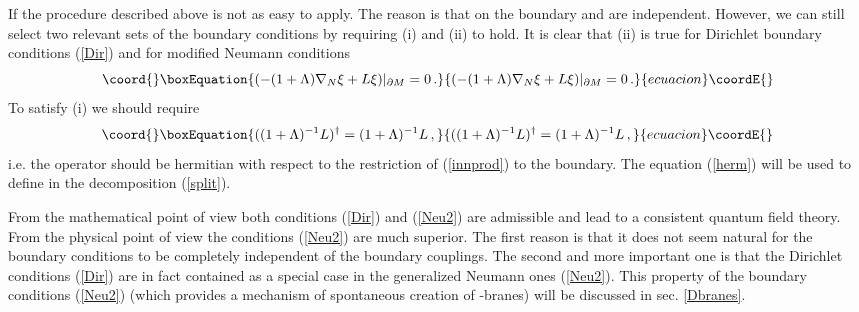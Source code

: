 \documentclass[a4paper,12pt]{article}
\begin{document}
If \coordHE{} the procedure described above is not as 
easy to apply. The reason is that on the boundary
\myHighlight{$\delta\xi$}\coordHE{} and \coordHE{} are independent.
However, we can still select 
two relevant sets of the boundary conditions by requiring 
(i) and (ii) to hold.
It is clear that (ii) is true for Dirichlet boundary
conditions (\ref{Dir}) and for modified Neumann
conditions
\begin{equation}\coord{}\boxEquation{
(-(1+\Lambda )\nabla_N\xi +L\xi )\vert_{\partial M} =0 \,.\label{Neu2}
}{
(-(1+\Lambda )\nabla_N\xi +L\xi )\vert_{\partial M} =0 \,.}{ecuacion}\coordE{}\end{equation}
To satisfy (i) we should require
\begin{equation}\coord{}\boxEquation{
((1+\Lambda )^{-1}L)^\dag =(1+\Lambda )^{-1}L\,, \label{herm}
}{
((1+\Lambda )^{-1}L)^\dag =(1+\Lambda )^{-1}L\,, }{ecuacion}\coordE{}\end{equation}
i.e. the operator \coordHE{} should be hermitian
with respect to the restriction of (\ref{innprod})
to the boundary. The equation (\ref{herm}) will be used
to define \coordHE{} in the decomposition
(\ref{split}).

{}From the mathematical point of view both conditions
(\ref{Dir}) and (\ref{Neu2}) are admissible and lead
to a consistent quantum field theory. From the physical
point of view the conditions (\ref{Neu2}) are much
superior. The first reason is that it does not seem natural
for the boundary conditions to be completely independent
of the boundary couplings. The second and  more
important one is that the  Dirichlet conditions
(\ref{Dir}) are in fact contained as a special case in the 
generalized Neumann ones 
(\ref{Neu2}). This property of the boundary conditions
(\ref{Neu2}) (which provides a mechanism of spontaneous creation
of \coordHE{}-branes) will be discussed in sec. \ref{Dbranes}.
\end{document}

